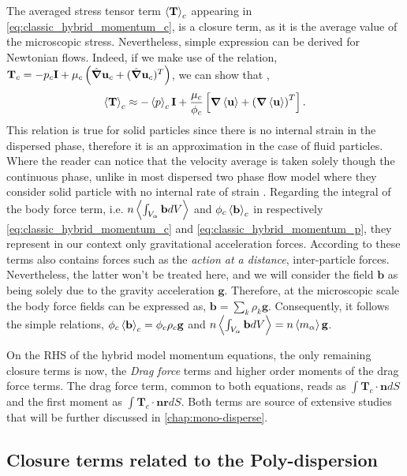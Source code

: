 The averaged stress tensor term $\left<\textbf{T}\right>_c$ appearing in \ref{eq:classic_hybrid_momentum_c}, is a closure term, as it is the average value of the microscopic stress. 
Nevertheless, simple expression can be derived for Newtonian flows. 
Indeed, if we make use of the relation, $\textbf{T}_c = -p_c\textbf{I} + \mu_c \left(\hat{\bm{\nabla}} \textbf{u}_c+ (\hat{\bm{\nabla}} \textbf{u}_c)^T\right)$, 
we can show that \citep{jackson2000dynamics}, 
\begin{equation*}
    \left<\textbf{T}\right>_c \approx - \left<p\right>_c\textbf{I} 
    + \frac{\mu_c}{\phi_c} \left[\bm{\nabla} \left<\textbf{u}\right> + \left(\bm{\nabla} \left<\textbf{u}\right>\right)^T\right].
\end{equation*}
This relation is true for solid particles since there is no internal strain in the dispersed phase, therefore it is an approximation in the case of fluid particles.  
Where the reader can notice that the velocity average is taken solely though the continuous phase, unlike in most dispersed two phase flow model where they consider solid particle with no internal rate of strain \citep{jackson1997locally}. 
Regarding the integral of the body force term, i.e. $n \left<\int_{V_\alpha} \textbf{b} dV\right>$ and $\phi_c\left<\textbf{b}\right>_c$ in respectively \ref{eq:classic_hybrid_momentum_c} and \ref{eq:classic_hybrid_momentum_p}, they represent in our context only gravitational acceleration forces. 
According to \citet{nott2011suspension} these terms also contains forces such as the \textit{action at a distance}, inter-particle forces.
Nevertheless, the latter won't be treated here, and we will consider the field $\textbf{b}$ as being solely due to the gravity acceleration $\textbf{g}$. 
Therefore, at the microscopic scale the body force fields can be expressed as, $\textbf{b} = \sum_{k} \rho_k \textbf{g}$. 
Consequently, it follows the simple relations, $\phi_c\left<\textbf{b}\right>_c = \phi_c \rho_c \textbf{g}$ and $n \left<\int_{V_\alpha} \textbf{b} dV\right> = n \left<m_\alpha\right>\textbf{g}$.  


On the RHS of the hybrid model momentum equations, the only remaining closure terms is now, the \textit{Drag force} terms and higher order moments of the drag force terms. 
The drag force term, common to both equations, reads as $\int \textbf{T}_c \cdot \textbf{n} dS$ and the first moment as $ \int \textbf{T}_c \cdot \textbf{nr} dS$. 
Both terms are source of extensive studies that will be further discussed in \ref{chap:mono-disperse}.

\subsection{Closure terms related to the Poly-dispersion}

